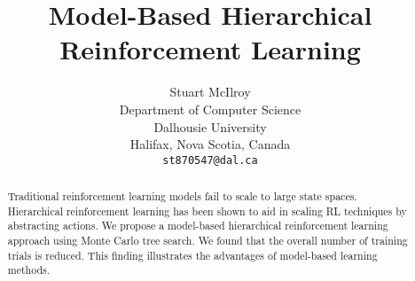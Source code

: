 \documentclass{article} %
\title{Model-Based Hierarchical Reinforcement Learning}
\author{
Stuart McIlroy \\
Department of Computer Science\\
Dalhousie University\\
Halifax, Nova Scotia, Canada \\
\texttt{st870547@dal.ca} \\
}
\begin{document}
\graphicspath{{figures/}}
\maketitle

\begin{abstract}
Traditional reinforcement learning models fail to scale to large state spaces. Hierarchical reinforcement learning has been shown to aid in scaling RL techniques by abstracting actions. We propose a model-based hierarchical reinforcement learning approach using Monte Carlo tree search. We found that the overall number of training trials is reduced. This finding illustrates the advantages of model-based learning methods.
\end{abstract}











{}

\end{document}
